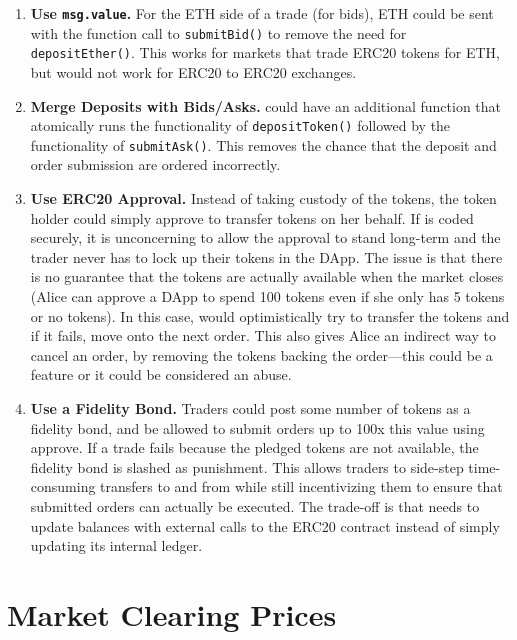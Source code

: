 \begin{enumerate}

\item \textbf{Use \texttt{msg.value}.} For the ETH side of a trade (\ie for bids), ETH could be sent with the function call to \texttt{submitBid()} to remove the need for    \texttt{depositEther()}. This works for markets that trade ERC20 tokens for ETH, but would not work for ERC20 to ERC20 exchanges.

\item \textbf{Merge Deposits with Bids/Asks.} \cm could have an additional function that atomically runs the functionality of \texttt{depositToken()} followed by the functionality of \texttt{submitAsk()}. This removes the chance that the deposit and order submission are ordered incorrectly.

\item \textbf{Use ERC20 Approval.} Instead of \cm taking custody of the tokens, the token holder could simply approve \cm to transfer tokens on her behalf. If \cm is coded securely, it is unconcerning to allow the approval to stand long-term and the trader never has to lock up their tokens in the DApp. The issue is that there is no guarantee that the tokens are actually available when the market closes (\ie Alice can approve a DApp to spend 100 tokens even if she only has 5 tokens or no tokens). In this case, \cm would optimistically try to transfer the tokens and if it fails, move onto the next order. This also gives Alice an indirect way to cancel an order, by removing the tokens backing the order---this could be a feature or it could be considered an abuse.

\item \textbf{Use a Fidelity Bond.} Traders could post some number of tokens as a fidelity bond, and be allowed to submit orders up to 100x this value using approve. If a trade fails because the pledged tokens are not available, the fidelity bond is slashed as punishment. This allows traders to side-step time-consuming transfers to and from \cm while still incentivizing them to ensure that submitted orders can actually be executed. The trade-off  is that \cm needs to update balances with external calls to the ERC20 contract instead of simply updating its internal ledger.

\end{enumerate}

\section{Market Clearing Prices}

